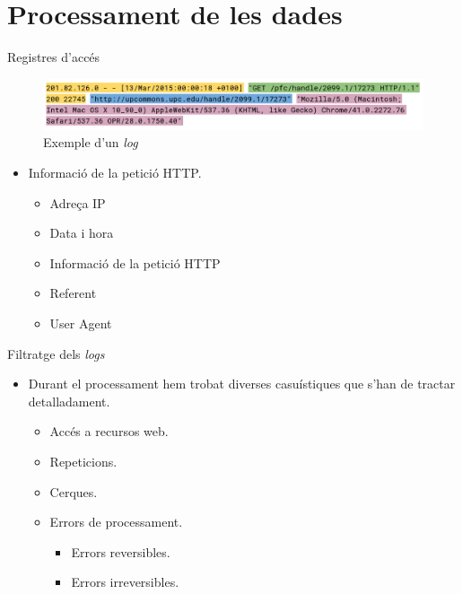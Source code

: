\section{Processament de les dades}\label{sec:data-processing}

\begin{frame}{Registres d'accés}

\begin{figure}
    \includegraphics[width=\textwidth]{figures/example-log}
    \caption{Exemple d'un \textit{log}\label{fig:log-example}}
\end{figure}

\begin{itemize}%
    \item Informació de la petició HTTP.
    \begin{itemize}%
        \item Adreça IP
        \item Data i hora
        \item Informació de la petició HTTP
        \item Referent
        \item User Agent
    \end{itemize}
\end{itemize}

\end{frame}


\begin{frame}{Filtratge dels \textit{logs}}
    \begin{itemize}%
        \item Durant el processament hem trobat diverses casuístiques que s'han de tractar detalladament.
        \begin{itemize}%
            \item Accés a recursos web.
            \item Repeticions.
            \item Cerques.
            \item Errors de processament.
            \begin{itemize}%
                \item Errors reversibles.
                \item Errors irreversibles.
            \end{itemize}
        \end{itemize}
    \end{itemize}
\end{frame}


